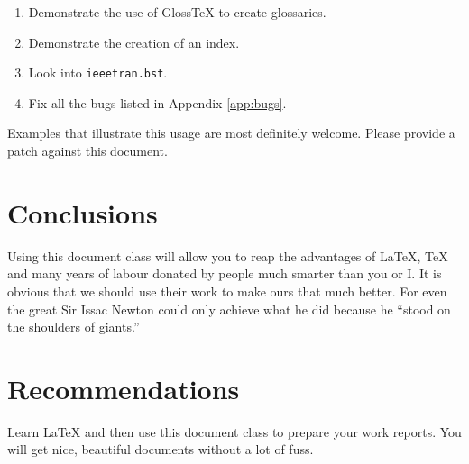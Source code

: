 \documentclass{uw-wkrpt}
\begin{document}
\begin{enumerate}
  \item Demonstrate the use of Gloss\TeX{} to create glossaries.
  \item Demonstrate the creation of an index.
  \item Look into \texttt{ieeetran.bst}.
  \item Fix all the bugs listed in Appendix \ref{app:bugs}.
\end{enumerate}

Examples that illustrate this usage are most definitely welcome.  Please
provide a patch against this document.

\section{Conclusions}
Using this document class will allow you to reap the advantages of
\LaTeX{}, \TeX{} and many years of labour donated by people much 
smarter than you or I.  It is obvious that we should use their work
to make ours that much better.  For even the great Sir Issac Newton
could only achieve what he did because he ``stood on the shoulders
of giants.''

\section{Recommendations}
Learn \LaTeX{} and then use this document class to prepare your
work reports.  You will get nice, beautiful documents without a lot
of fuss.

\backmatter

%
\printbibliography[heading=bibintoc]
\end{document}
